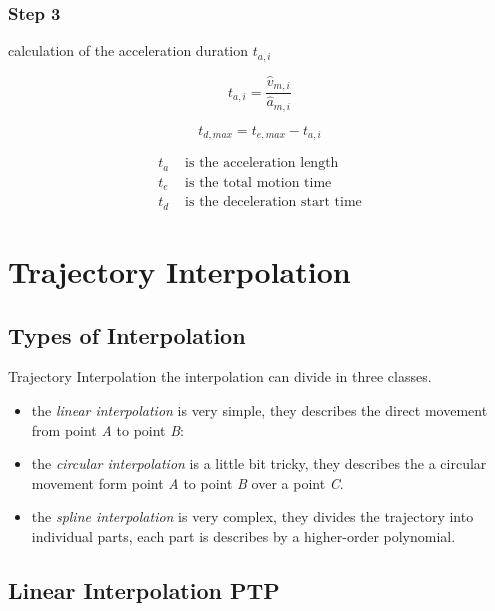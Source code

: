 \documentclass[professionalfonts, 
               xcolor={ usenames, %
                        dvipsnames,%
                        svgnames,%
                        table,%
                        hyperref%
                      }
              ]{beamer}
\begin{document}
\subsubsection{Step 3}
\begin{frame}
calculation of the acceleration duration $t_{a,i}$

\begin{equation}
t_{a,i} = \frac{\hat{v}_{m,i}}{\hat{a}_{m,i}}
\end{equation}

\begin{equation}
t_{d,max} = t_{e,max}-t_{a,i}
\end{equation}      

\begin{align*}
t_{a} & \text{ is the acceleration length} \\
t_{e} & \text{ is the total motion time} \\
t_{d} & \text{ is the deceleration start time}
\end{align*}
\end{frame}

\section{Trajectory Interpolation}
\subsection{Types of Interpolation}
\begin{frame}{Trajectory Interpolation}
the interpolation can divide in three classes.
\begin{itemize}
\item the \emph{linear interpolation} is very simple, they describes the direct movement from point \emph{A} to point \emph{B}:
\item the \emph{circular interpolation} is a little bit tricky, they describes the a circular movement form point \emph{A} to point \emph{B} over a point \emph{C}.
\item the \emph{spline interpolation} is very complex, they divides the trajectory into individual parts, each part is describes by a higher-order polynomial.
\end{itemize}
\end{frame}

\subsection{Linear Interpolation PTP}
%
\end{document}
